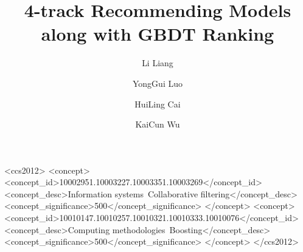 \documentclass[manuscript,noacm]{acmart}
\begin{document}
\title{4-track Recommending Models along with GBDT Ranking}


\author{Li Liang}

\author{YongGui Luo}

\author{HuiLing Cai}
  
\author{KaiCun Wu}



\begin{CCSXML}
<ccs2012>
   <concept>
       <concept_id>10002951.10003227.10003351.10003269</concept_id>
       <concept_desc>Information systems~Collaborative filtering</concept_desc>
       <concept_significance>500</concept_significance>
       </concept>
   <concept>
       <concept_id>10010147.10010257.10010321.10010333.10010076</concept_id>
       <concept_desc>Computing methodologies~Boosting</concept_desc>
       <concept_significance>500</concept_significance>
       </concept>
 </ccs2012>
\end{CCSXML}

\end{document}
